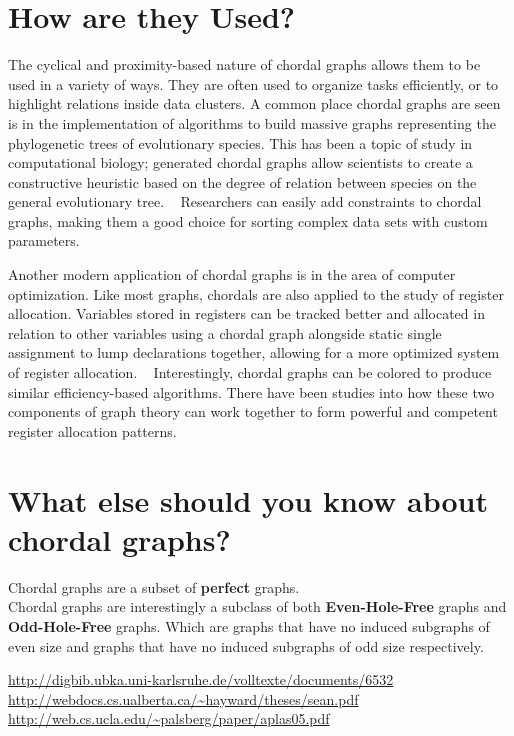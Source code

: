 \section{How are they Used?}
The cyclical and proximity-based nature of chordal graphs allows them to be used in a variety of ways. They are often used to organize
tasks efficiently, or to highlight relations inside data clusters. A common place chordal graphs are seen is in the implementation of algorithms to build
massive graphs representing the phylogenetic trees of evolutionary species. This has been a topic of study in computational biology; generated chordal
graphs allow scientists to create a constructive heuristic based on the degree of relation between species on the general evolutionary tree. ~\cite{kennedy_2005}
Researchers can easily add constraints to chordal graphs, making them a good choice for sorting complex data sets with custom parameters.\par
Another modern application of chordal graphs is in the area of computer optimization. Like most graphs, chordals are also applied to the study of
register allocation. Variables stored in registers can be tracked better and allocated in relation to other variables using a chordal graph alongside
static single assignment to lump declarations together, allowing for a more optimized system of register allocation. ~\cite{hack_2007} Interestingly, chordal graphs
can be colored to produce similar efficiency-based algorithms. There have been studies into how these two components of graph theory can work together to
form powerful and competent register allocation patterns. \cite{pereira_palsberg}\\

\section{What else should you know about chordal graphs?}
Chordal graphs are a subset of \textbf{perfect} graphs.\\
Chordal graphs are interestingly a subclass of both \textbf{Even-Hole-Free} graphs and \textbf{Odd-Hole-Free} graphs.
Which are graphs that have no induced subgraphs of even size and graphs that have no induced subgraphs of odd size respectively.

\url{http://digbib.ubka.uni-karlsruhe.de/volltexte/documents/6532}\\
\url{http://webdocs.cs.ualberta.ca/~hayward/theses/sean.pdf}\\
\url{http://web.cs.ucla.edu/~palsberg/paper/aplas05.pdf}



